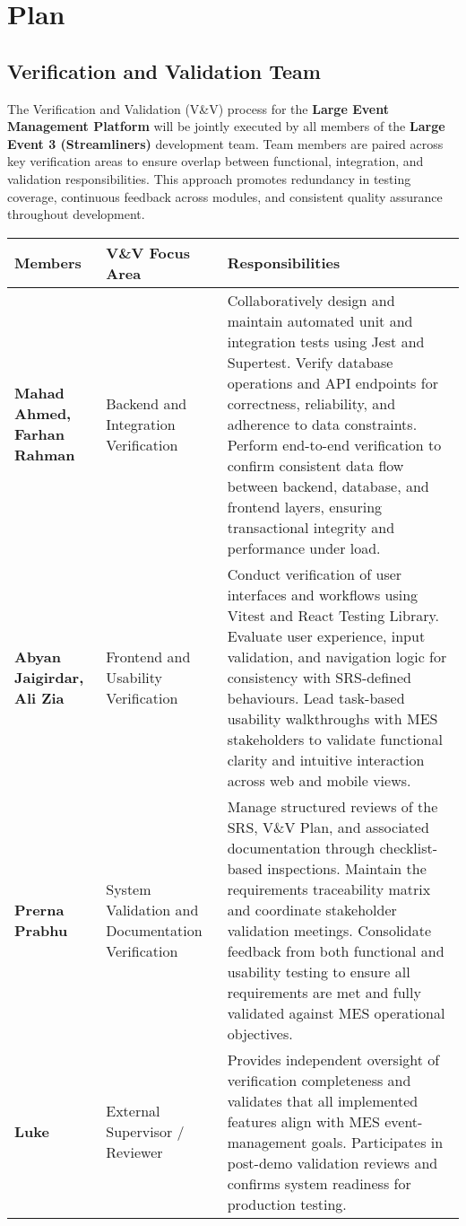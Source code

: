 \documentclass[12pt, titlepage]{article}
\begin{document}
\section{Plan}


\subsection{Verification and Validation Team}

The Verification and Validation (V\&V) process for the \textbf{Large Event Management Platform} will be jointly executed by all members of the \textbf{Large Event 3 (Streamliners)} development team. Team members are paired across key verification areas to ensure overlap between functional, integration, and validation responsibilities. This approach promotes redundancy in testing coverage, continuous feedback across modules, and consistent quality assurance throughout development.

\begin{center}
\begin{tabular}{|p{4cm}|p{4cm}|p{7cm}|}
\hline
\textbf{Members} & \textbf{V\&V Focus Area} & \textbf{Responsibilities} \\ \hline
\textbf{Mahad Ahmed, Farhan Rahman} & Backend and Integration Verification & Collaboratively design and maintain automated unit and integration tests using Jest and Supertest. Verify database operations and API endpoints for correctness, reliability, and adherence to data constraints. Perform end-to-end verification to confirm consistent data flow between backend, database, and frontend layers, ensuring transactional integrity and performance under load. \\ \hline
\textbf{Abyan Jaigirdar, Ali Zia} & Frontend and Usability Verification & Conduct verification of user interfaces and workflows using Vitest and React Testing Library. Evaluate user experience, input validation, and navigation logic for consistency with SRS-defined behaviours. Lead task-based usability walkthroughs with MES stakeholders to validate functional clarity and intuitive interaction across web and mobile views. \\ \hline
\textbf{Prerna Prabhu} & System Validation and Documentation Verification & Manage structured reviews of the SRS, V\&V Plan, and associated documentation through checklist-based inspections. Maintain the requirements traceability matrix and coordinate stakeholder validation meetings. Consolidate feedback from both functional and usability testing to ensure all requirements are met and fully validated against MES operational objectives. \\ \hline
\textbf{Luke} & External Supervisor / Reviewer & Provides independent oversight of verification completeness and validates that all implemented features align with MES event-management goals. Participates in post-demo validation reviews and confirms system readiness for production testing. \\ \hline
\end{tabular}
\end{center}
\end{document}
